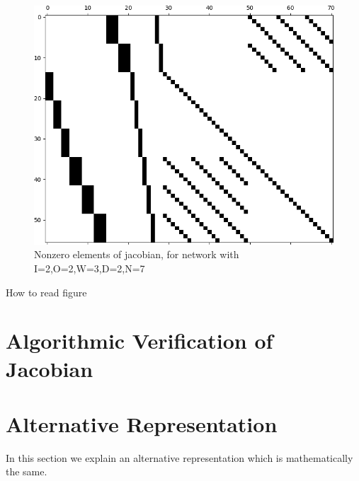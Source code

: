 \begin{figure}[p]
  \centering
  \includegraphics[width=\textwidth]{jac.png}
  \caption{Nonzero elements of jacobian, for network with I=2,O=2,W=3,D=2,N=7}
  \label{jac}
\end{figure}
How to read figure

\section{Algorithmic Verification of Jacobian}

\section{Alternative Representation}

In this section we explain an alternative representation which is mathematically the same.

